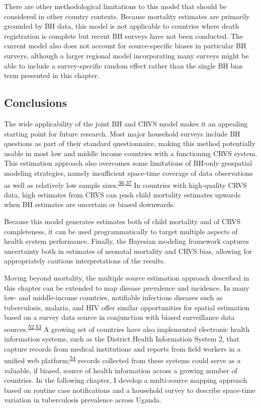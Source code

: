 \documentclass[
]{article}
\begin{document}
There are other methodological limitations to this model that should be considered in other country contexts. Because mortality estimates are primarily grounded by BH data, this model is not applicable to countries where death registration is complete but recent BH surveys have not been conducted. The current model also does not account for source-specific biases in particular BH surveys, although a larger regional model incorporating many surveys might be able to include a survey-specific random effect rather than the single BH bias term presented in this chapter.

\hypertarget{conclusions}{%
\subsection{Conclusions}\label{conclusions}}

The wide applicability of the joint BH and CRVS model makes it an appealing starting point for future research. Most major household surveys include BH questions as part of their standard questionnaire, making this method potentially usable in most low and middle income countries with a functioning CRVS system. This estimation approach also overcomes some limitations of BH-only geospatial modeling strategies, namely insufficient space-time coverage of data observations as well as relatively low sample sizes.\textsuperscript{\protect\hyperlink{ref-Burstein2019}{36},\protect\hyperlink{ref-Wakefield2019}{37}} In countries with high-quality CRVS data, high estimates from CRVS can push child mortality estimates upwards when BH estimates are uncertain or biased downwards.

Because this model generates estimates both of child mortality and of CRVS completeness, it can be used programmatically to target multiple aspects of health system performance. Finally, the Bayesian modeling framework captures uncertainty both in estimates of neonatal mortality and CRVS bias, allowing for appropriately cautious interpretations of the results.

Moving beyond mortality, the multiple source estimation approach described in this chapter can be extended to map disease prevalence and incidence. In many low- and middle-income countries, notifiable infectious diseases such as tuberculosis, malaria, and HIV offer similar opportunities for spatial estimation based on a survey data source in conjunction with biased surveillance data sources.\textsuperscript{\protect\hyperlink{ref-Rood2019}{52},\protect\hyperlink{ref-Dwyer-Lindgren2019}{53}} A growing set of countries have also implemented electronic health information systems, such as the District Health Information System 2, that capture records from medical institutions and reports from field workers in a unified web platform;\textsuperscript{\protect\hyperlink{ref-Dehnavieh2019}{54}} records collected from these systems could serve as a valuable, if biased, source of health information across a growing number of countries. In the following chapter, I develop a multi-source mapping approach based on routine case notifications and a household survey to describe space-time variation in tuberculosis prevalence across Uganda.
\end{document}
